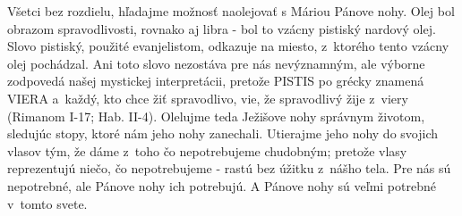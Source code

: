 Všetci bez rozdielu, hľadajme možnosť naolejovať s Máriou Pánove nohy. Olej bol obrazom spravodlivosti, rovnako aj libra - bol to vzácny pistiský nardový olej. Slovo pistiský, použité evanjelistom, odkazuje na miesto, z~ktorého tento vzácny olej pochádzal. Ani toto slovo nezostáva pre nás nevýznamným, ale výborne zodpovedá našej mystickej interpretácii, pretože PISTIS po grécky znamená VIERA a~každý, kto chce žiť spravodlivo, vie, že spravodlivý žije z~viery (Rimanom I-17; Hab. II-4). Olelujme teda Ježišove nohy správnym životom, sledujúc stopy, ktoré nám jeho nohy zanechali. Utierajme jeho nohy do svojich vlasov tým, že dáme z~toho čo nepotrebujeme chudobným; pretože vlasy reprezentujú niečo, čo nepotrebujeme - rastú bez úžitku z~nášho tela. Pre nás sú nepotrebné, ale Pánove nohy ich potrebujú. A Pánove nohy sú veľmi potrebné v~tomto svete.
